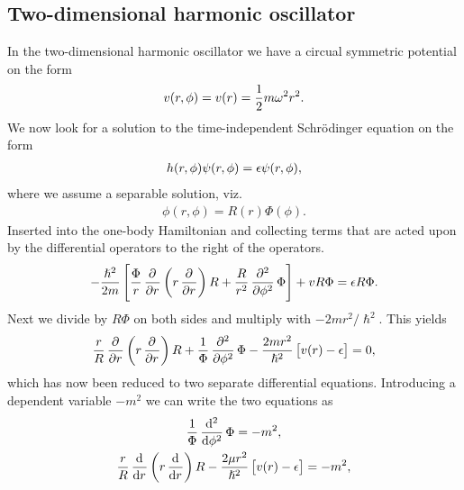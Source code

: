     \subsection{Two-dimensional harmonic oscillator}
        In the two-dimensional harmonic oscillator we have a circual symmetric
        potential on the form
        \begin{align}
            v(r, \phi) = v(r) = \frac{1}{2} m \omega^2 r^2.
        \end{align}
        We now look for a solution to the time-independent Schrödinger equation
        on the form
        \begin{align}
            h(r, \phi)\psi(r, \phi) = \epsilon \psi(r, \phi),
        \end{align}
        where we assume a separable solution, viz.
        \begin{align}
            \phi(r, \phi) = R(r)\Phi(\phi).
        \end{align}
        Inserted into the one-body Hamiltonian and collecting terms that are
        acted upon by the differential operators to the right of the operators.
        \begin{gather}
            -\frac{\hslash^2}{2m}\brak{
                \frac{\Phi}{r}\dpd{}{r}\para{
                    r\dpd{}{r}
                }R
                + \frac{R}{r^2}\dpd[2]{}{\phi}\Phi
            }
            + v R \Phi = \epsilon R \Phi.
        \end{gather}
        Next we divide by $R\Phi$ on both sides and multiply with $-2m r^2
        /\hslash^2$.
        This yields
        \begin{gather}
            \frac{r}{R}\dpd{}{r}\para{
                r\dpd{}{r}
            } R
            + \frac{1}{\Phi}
            \dpd[2]{}{\phi}
            \Phi
            - \frac{2m r^2}{\hslash^2} \brak{
                v(r) - \epsilon
            } = 0,
        \end{gather}
        which has now been reduced to two separate differential equations.
        Introducing a dependent variable $- m^2$ we can write the two equations
        as
        \begin{gather}
            \frac{1}{\Phi}\dod[2]{}{\phi}\Phi = -m^2,
            \label{eq:tdho-angular-eq}
            \\
            \frac{r}{R}\dod{}{r}\para{
                r\dod{}{r}
            }R
            - \frac{2\mu r^2}{\hslash^2}\brak{
                v(r) - \epsilon
            }
            = -m^2,
            \label{eq:tdho-radial-eq}
        \end{gather}
